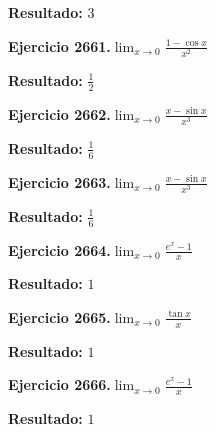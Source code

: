 \documentclass[10pt,a4paper]{article}
\begin{document}
\begin{solbox}
\textbf{Resultado:} \(\displaystyle 3\)
\end{solbox}

\newpage
\begin{ejbox}
\textbf{Ejercicio 2661.}\quad $\lim_{x\to 0} \frac{1-\cos x}{x^2}$
\end{ejbox}

\begin{solbox}
\textbf{Resultado:} \(\displaystyle \frac{1}{2}\)
\end{solbox}

\begin{ejbox}
\textbf{Ejercicio 2662.}\quad $\lim_{x\to 0} \frac{x-\sin x}{x^3}$
\end{ejbox}

\begin{solbox}
\textbf{Resultado:} \(\displaystyle \frac{1}{6}\)
\end{solbox}

\begin{ejbox}
\textbf{Ejercicio 2663.}\quad $\lim_{x\to 0} \frac{x-\sin x}{x^3}$
\end{ejbox}

\begin{solbox}
\textbf{Resultado:} \(\displaystyle \frac{1}{6}\)
\end{solbox}

\newpage
\begin{ejbox}
\textbf{Ejercicio 2664.}\quad $\lim_{x\to 0} \frac{e^x-1}{x}$
\end{ejbox}

\begin{solbox}
\textbf{Resultado:} \(\displaystyle 1\)
\end{solbox}

\begin{ejbox}
\textbf{Ejercicio 2665.}\quad $\lim_{x\to 0} \frac{\tan x}{x}$
\end{ejbox}

\begin{solbox}
\textbf{Resultado:} \(\displaystyle 1\)
\end{solbox}

\begin{ejbox}
\textbf{Ejercicio 2666.}\quad $\lim_{x\to 0} \frac{e^x-1}{x}$
\end{ejbox}

\begin{solbox}
\textbf{Resultado:} \(\displaystyle 1\)
\end{solbox}
\end{document}
